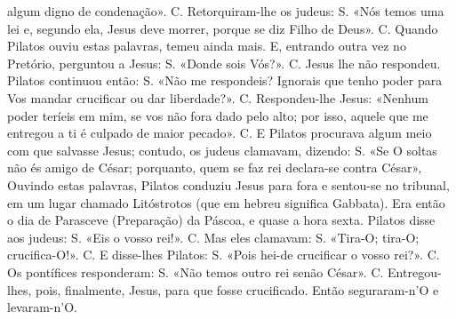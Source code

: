 \begin{paracol}{2}
{algum digno de condenação». {\redx C.} Retorquiram-lhe os judeus: {\redx S.} «Nós temos uma lei e, segundo ela, Jesus deve morrer, porque se diz Filho de Deus». {\redx C.} Quando Pilatos ouviu estas palavras, temeu ainda mais. E, entrando outra vez no Pretório, perguntou a Jesus: {\redx S.} «Donde sois Vós?». {\redx C.} Jesus lhe não respondeu. Pilatos continuou então: {\redx S.} «Não me respondeis? Ignorais que tenho poder para Vos mandar crucificar ou dar liberdade?». {\redx C.} Respondeu-lhe Jesus: \cruz «Nenhum poder teríeis em mim, se vos não fora dado pelo alto; por isso, aquele que me entregou a ti é culpado de maior pecado». {\redx C.} E Pilatos procurava algum meio com que salvasse Jesus; contudo, os judeus clamavam, dizendo: {\redx S.} «Se O soltas não és amigo de César; porquanto, quem se faz rei declara-se contra César», Ouvindo estas palavras, Pilatos conduziu Jesus para fora e sentou-se no tribunal, em um lugar chamado Litóstrotos (que em hebreu significa Gabbata). Era então o dia de Parasceve (Preparação) da Páscoa, e quase a hora sexta. Pilatos disse aos judeus: {\redx S.} «Eis o vosso rei!». {\redx C.} Mas eles clamavam: {\redx S.} «Tira-O; tira-O; crucifica-O!». {\redx C.} E disse-lhes Pilatos: {\redx S.} «Pois hei-de crucificar o vosso rei?». {\redx C.} Os pontífices responderam: {\redx S.} «Não temos outro rei senão César». {\redx C.} Entregou-lhes, pois, finalmente, Jesus, para que fosse crucificado. Então seguraram-n’O e levaram-n’O.
}\switchcolumn*{}\switchcolumn\portugues{
}
\end{paracol}
